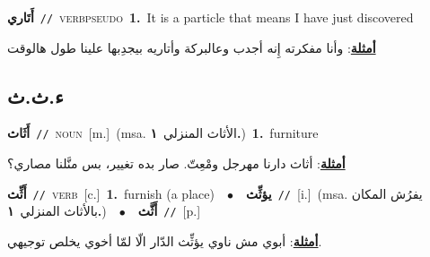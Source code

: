 \documentclass[10pt,a4paper,twoside]{article} %
\begin{document}
\begin{multicols}{2}
{{{{\setlength\topsep{0pt}\textbf{\foreignlanguage{arabic}{أَتَاري}}\ {\color{gray}\texttt{//}\color{black}}\ \textsc{verb\textunderscore pseudo}\ \textbf{1.}~It is a particle that means I have just discovered\  \begin{flushright}\color{gray}\foreignlanguage{arabic}{\textbf{\underline{\foreignlanguage{arabic}{أمثلة}}}: وأنا مفكرته إِنه أجدب وعالبركة وأتاريه بيجدِبها علينا طول هالوقت}\end{flushright}\color{black}} \vspace{2mm}

\vspace{-3mm}
\subsection*{\color{blue}\foreignlanguage{arabic}{ء.ث.ث}\color{blue}{}} 

{\setlength\topsep{0pt}\textbf{\foreignlanguage{arabic}{أَثَاث}}\ {\color{gray}\texttt{//}\color{black}}\ \textsc{noun}\ [m.]\ \color{gray}(msa. \foreignlanguage{arabic}{الأثاث المنزلي}~\foreignlanguage{arabic}{\textbf{١.}})\color{black}\ \textbf{1.}~furniture\  \begin{flushright}\color{gray}\foreignlanguage{arabic}{\textbf{\underline{\foreignlanguage{arabic}{أمثلة}}}: أثاث دارنا مهرجل ومْعِتّ. صار بده تغيير، بس منَّلنا مصاري؟}\end{flushright}\color{black}} \vspace{2mm}

{\setlength\topsep{0pt}\textbf{\foreignlanguage{arabic}{أَثِّث}}\ {\color{gray}\texttt{//}\color{black}}\ \textsc{verb}\ [c.]\ \textbf{1.}~furnish (a place)\ \ $\bullet$\ \ \setlength\topsep{0pt}\textbf{\foreignlanguage{arabic}{يؤثِّث}}\ {\color{gray}\texttt{//}\color{black}}\ [i.]\ \color{gray}(msa. \foreignlanguage{arabic}{يفرُش المكان بالأثاث المنزلي}~\foreignlanguage{arabic}{\textbf{١.}})\color{black}\ \ $\bullet$\ \ \setlength\topsep{0pt}\textbf{\foreignlanguage{arabic}{أَثَّث}}\ {\color{gray}\texttt{//}\color{black}}\ [p.]\  \begin{flushright}\color{gray}\foreignlanguage{arabic}{\textbf{\underline{\foreignlanguage{arabic}{أمثلة}}}: أبوي مش ناوي يؤثِّث الدّار الّا لمّا أخوي يخلص توجيهي.}\end{flushright}\color{black}} \vspace{2mm}

}}}
\end{multicols}
\end{document}
